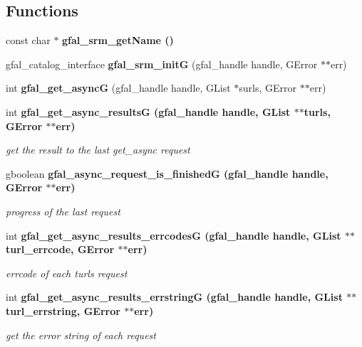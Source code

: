 \subsection*{Functions}
\begin{CompactItemize}
\item 
const char $\ast$ \bf{gfal\_\-srm\_\-get\-Name} ()
\item 
gfal\_\-catalog\_\-interface \textbf{gfal\_\-srm\_\-init\-G} (gfal\_\-handle handle, GError $\ast$$\ast$err)\label{gfal__common__srm_8h_0f8ff443c68a9f6177d717ad52b7d5a5}

\item 
int \textbf{gfal\_\-get\_\-async\-G} (gfal\_\-handle handle, GList $\ast$surls, GError $\ast$$\ast$err)\label{gfal__common__srm_8h_95ffd4de24c18af334c1d9c270de7d81}

\item 
int \bf{gfal\_\-get\_\-async\_\-results\-G} (gfal\_\-handle handle, GList $\ast$$\ast$turls, GError $\ast$$\ast$err)
\begin{CompactList}\small\item\em get the result to the last get\_\-async request \item\end{CompactList}\item 
gboolean \bf{gfal\_\-async\_\-request\_\-is\_\-finished\-G} (gfal\_\-handle handle, GError $\ast$$\ast$err)
\begin{CompactList}\small\item\em progress of the last request \item\end{CompactList}\item 
int \bf{gfal\_\-get\_\-async\_\-results\_\-errcodes\-G} (gfal\_\-handle handle, GList $\ast$$\ast$turl\_\-errcode, GError $\ast$$\ast$err)
\begin{CompactList}\small\item\em errcode of each turls request \item\end{CompactList}\item 
int \bf{gfal\_\-get\_\-async\_\-results\_\-errstring\-G} (gfal\_\-handle handle, GList $\ast$$\ast$turl\_\-errstring, GError $\ast$$\ast$err)
\begin{CompactList}\small\item\em get the error string of each request \item\end{CompactList}\item 
$$
\end{CompactItemize}
